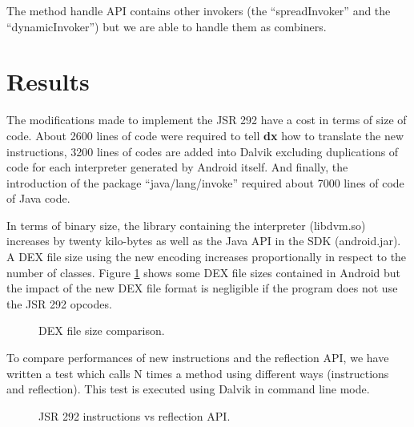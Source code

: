 \documentclass{sig-alternate}
\def \DALVIK{Dalvik\xspace}
\def \Jsr{JSR\xspace}
\def \JSR{\Jsr 292\xspace}
\def \ANDROID{Android\xspace}
\newcommand{\fixme}[1]{{\color{red}FIXME #1}}
\begin{document}
      The method handle API contains other invokers (the ``spreadInvoker'' and the ``dynamicInvoker'')
      but we are able to handle them as combiners.

\section{Results}
 \label{result}

  The modifications made to implement the \JSR have a cost in terms of size of code.
  About 2600 lines of code were required to tell {\bf dx} how to translate the new instructions,
  3200 lines of codes are added into Dalvik excluding duplications of code for each interpreter generated by \ANDROID itself.
  And finally, the introduction of the package ``java/lang/invoke'' required about 7000 lines of code of Java code.


  In terms of binary size, the library containing the interpreter (libdvm.so) increases by twenty kilo-bytes
  as well as the Java API in the SDK (android.jar).
  A DEX file size using the new encoding increases proportionally in respect to the number of classes.
  Figure \ref{Rsize} shows some DEX file sizes contained in \ANDROID but
  the impact of the new DEX file format is negligible if the program does not use the \JSR opcodes.

  \begin{figure}[h]
    \dataset
    \resizebox{\linewidth}{!}{}
    \caption{DEX file size comparison.}
    \label{Rsize}
  \end{figure}

  To compare performances of new instructions and the reflection API,
  we have written a test which calls N times a method using different ways (instructions and reflection).
  This test is executed using \DALVIK in command line mode.

  \begin{figure}[!h]
    \resizebox{\linewidth}{!}{}
    \caption{JSR 292 instructions vs reflection API.}
    \label{Rinvoke}
  \end{figure}
\end{document}
